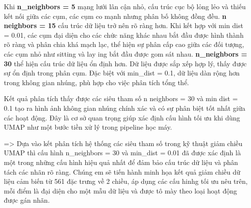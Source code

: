 \documentclass[
]{article}
\begin{document}
Khi \textbf{n\_neighbors = 5} mạng lưới lân cận nhỏ, cấu trúc cục bộ
lỏng lẻo và thiếu kết nối giữa các cụm, các cụm co mạnh nhưng phân bố
không đồng đều. \textbf{n neighbors = 15} cấu trúc dữ liệu trở nên rõ
ràng hơn. Khi kết hợp với min dist = 0.01, các cụm đại diện cho các chức
năng khác nhau bắt đầu được hình thành rõ ràng và phân chia khá mạch
lạc, thể hiện sự phân cấp cao giữa các đối tượng, các cụm nhỏ như
sitting và lay ing bắt đầu được gom sát nhau. \textbf{n\_neighbors = 30}
thể hiện cấu trúc dữ liệu ổn định hơn. Dữ liệu được sắp xếp hợp lý, thấy
được sự ổn định trong phân cụm. Đặc biệt với min\_dist = 0.1, dữ liệu
dàn rộng hơn trong không gian nhúng, phù hợp cho việc phân tích tổng
thể.

Kết quả phân tích thấy được các siêu tham số n neighbors = 30 và min
dist = 0.1 tạo ra hình ảnh không gian nhúng chính xác và có sự phân biệt
tốt nhất giữa các hoạt động. Đây là cơ sở quan trọng giúp xác định cấu
hình tối ưu khi dùng UMAP như một bước tiền xử lý trong pipeline học
máy.

=\textgreater{} Dựa vào kết phân tích hệ thống các siêu tham số trong kỹ
thuật giảm chiều UMAP thì cấu hình n\_neighbors = 30 và min\_dist = 0.01
đã được xác định là một trong những cấu hình hiệu quả nhất để đảm bảo
cấu trúc dữ liệu và phân tách các nhãn rõ ràng. Chúng em sẽ tiến hành
minh họa kết quả giảm chiều dữ liệu cảm biến từ 561 đặc trưng về 2
chiều, áp dụng các cấu hinhg tối ưu nêu trên, mỗi điểm là đại diện cho
một mẫu dữ liệu và được tô mày theo loại hoạt động được gán nhãn.
\end{document}
